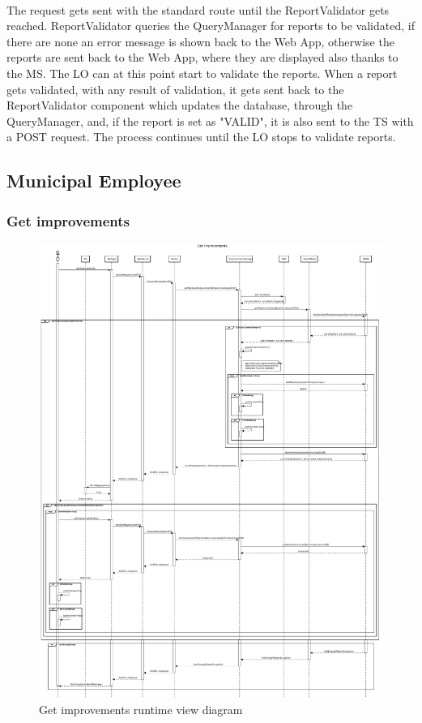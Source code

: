 					\paragraph{}
						The request gets sent with the standard route until the ReportValidator gets reached. ReportValidator queries the QueryManager for reports to be validated, if there are none an error message is shown back to the Web App, otherwise the reports are sent back to the Web App, where they are displayed also thanks to the MS.
						The LO can at this point start to validate the reports. When a report gets validated, with any result of validation, it gets sent back to the ReportValidator component which updates the database, through the QueryManager, and, if the report is set as "VALID", it is also sent to the TS with a POST request. The process continues until the LO stops to validate reports.
			\clearpage
			\subsection{Municipal Employee}
				\subsubsection{Get improvements}
					\begin{figure}[!h]
						\centering
						\includegraphics[width=\textwidth]{images/DD2/RuntimeView/Authority/ME/GetImprovements.pdf}
						\caption{Get improvements runtime view diagram}
					\end{figure}

